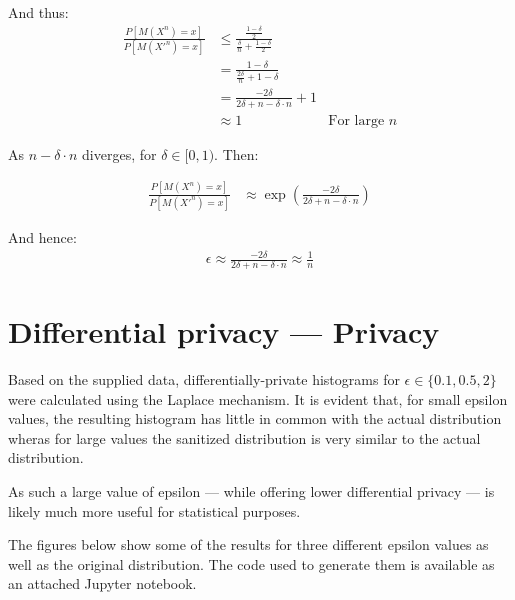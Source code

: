 \documentclass[a4paper]{scrreprt}
\begin{document}
And thus:
\begin{align*}
  \frac{P[M(X^n) = x]}{P[M(X'^n) = x]} & \leq \frac{\frac{1-\delta}{2}}{\frac{\delta}{n} + \frac{1-\delta}{2}} \\
                                       & = \frac{1 - \delta}{\frac{2 \delta}{n} + 1 - \delta} \\
                                       & = \frac{-2 \delta}{2 \delta + n  - \delta \cdot n} + 1 \\
                                       & \approx 1 & \text{For large } n
\end{align*}

As $n - \delta \cdot n$ diverges, for $\delta \in [0, 1)$. Then:

\begin{align*}
  \frac{P[M(X^n) = x]}{P[M(X'^n) = x]} & \approx \exp\left(\frac{-2 \delta}{2 \delta + n - \delta \cdot n}\right)
\end{align*}

And hence:
\begin{align*}
  \epsilon \approx \frac{-2 \delta}{2 \delta + n - \delta \cdot n} \approx \frac{1}{n}
\end{align*}

\section{Differential privacy --– Privacy}

Based on the supplied data, differentially-private histograms for $\epsilon \in
\{0.1, 0.5, 2\}$ were calculated using the Laplace mechanism. It is evident
that, for small epsilon values, the resulting histogram has little in common
with the actual distribution wheras for large values the sanitized distribution
is very similar to the actual distribution.

As such a large value of epsilon --- while offering lower differential privacy
--- is likely much more useful for statistical purposes.

The figures below show some of the results for three different epsilon values
as well as the original distribution. The code used to generate them is
available as an attached Jupyter notebook.
\end{document}
